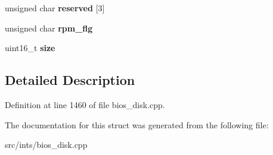 \begin{DoxyCompactItemize}
\item 
\hypertarget{structD88SEC_ae71af3325f276f748b4966972fd3832c}{unsigned char {\bfseries reserved} \mbox{[}3\mbox{]}}\label{structD88SEC_ae71af3325f276f748b4966972fd3832c}

\item 
\hypertarget{structD88SEC_a2bfa52815aee40f7c5383a0a51175aa3}{unsigned char {\bfseries rpm\-\_\-flg}}\label{structD88SEC_a2bfa52815aee40f7c5383a0a51175aa3}

\item 
\hypertarget{structD88SEC_af830ea69e2aa174d018743dfbc12edce}{uint16\-\_\-t {\bfseries size}}\label{structD88SEC_af830ea69e2aa174d018743dfbc12edce}

\end{DoxyCompactItemize}


\subsection{Detailed Description}


Definition at line 1460 of file bios\-\_\-disk.\-cpp.



The documentation for this struct was generated from the following file\-:\begin{DoxyCompactItemize}
\item 
src/ints/bios\-\_\-disk.\-cpp\end{DoxyCompactItemize}
